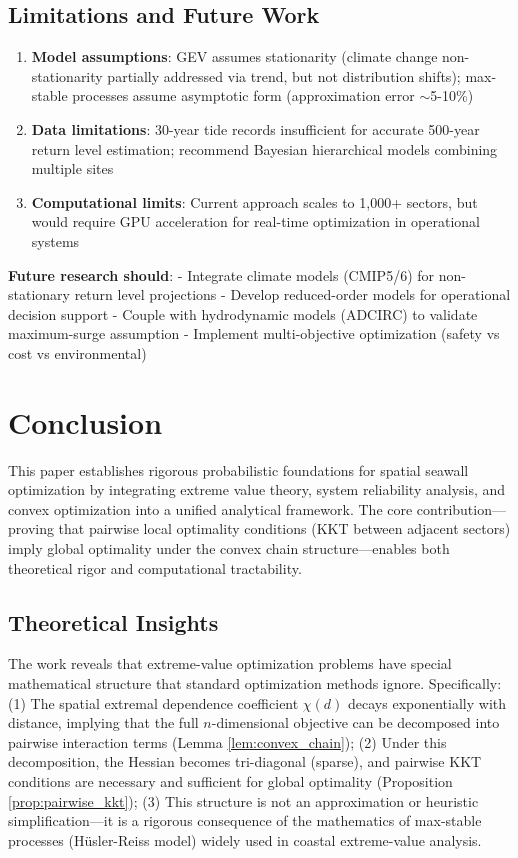\documentclass[review]{elsarticle}
\begin{document}
\subsection{Limitations and Future Work}

\begin{enumerate}
\item \textbf{Model assumptions}: GEV assumes stationarity (climate change non-stationarity partially addressed via trend, but not distribution shifts); max-stable processes assume asymptotic form (approximation error $\sim$5-10\%)

\item \textbf{Data limitations}: 30-year tide records insufficient for accurate 500-year return level estimation; recommend Bayesian hierarchical models combining multiple sites

\item \textbf{Computational limits}: Current approach scales to 1,000+ sectors, but would require GPU acceleration for real-time optimization in operational systems

\end{enumerate}

\textbf{Future research should}:
- Integrate climate models (CMIP5/6) for non-stationary return level projections
- Develop reduced-order models for operational decision support
- Couple with hydrodynamic models (ADCIRC) to validate maximum-surge assumption
- Implement multi-objective optimization (safety vs cost vs environmental)

\section{Conclusion}

This paper establishes rigorous probabilistic foundations for spatial seawall optimization by integrating extreme value theory, system reliability analysis, and convex optimization into a unified analytical framework. The core contribution—proving that pairwise local optimality conditions (KKT between adjacent sectors) imply global optimality under the convex chain structure—enables both theoretical rigor and computational tractability.

\subsection*{Theoretical Insights}

The work reveals that extreme-value optimization problems have special mathematical structure that standard optimization methods ignore. Specifically: (1) The spatial extremal dependence coefficient $\chi(d)$ decays exponentially with distance, implying that the full $n$-dimensional objective can be decomposed into pairwise interaction terms (Lemma \ref{lem:convex_chain}); (2) Under this decomposition, the Hessian becomes tri-diagonal (sparse), and pairwise KKT conditions are necessary and sufficient for global optimality (Proposition \ref{prop:pairwise_kkt}); (3) This structure is not an approximation or heuristic simplification—it is a rigorous consequence of the mathematics of max-stable processes (Hüsler-Reiss model) widely used in coastal extreme-value analysis.
\end{document}
